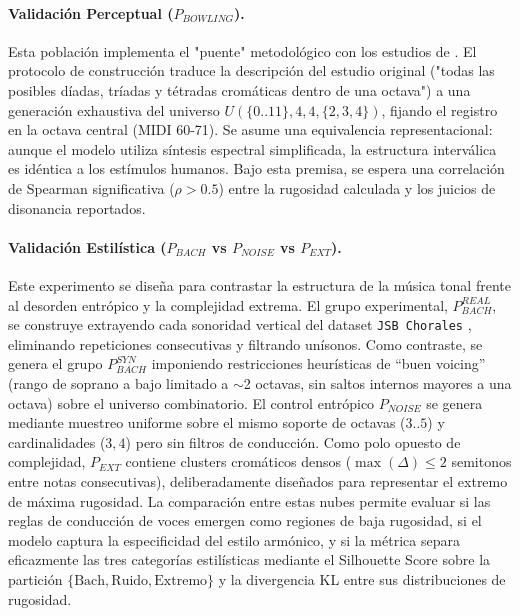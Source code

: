 \paragraph{Validación Perceptual ($P_{BOWLING}$).}
Esta población implementa el "puente" metodológico con los estudios de . El protocolo de construcción traduce la descripción del estudio original ("todas las posibles díadas, tríadas y tétradas cromáticas dentro de una octava") a una generación exhaustiva del universo $U(\{0..11\}, 4, 4, \{2, 3, 4\})$, fijando el registro en la octava central (MIDI 60-71). Se asume una equivalencia representacional: aunque el modelo utiliza síntesis espectral simplificada, la estructura interválica es idéntica a los estímulos humanos. Bajo esta premisa, se espera una correlación de Spearman significativa ($\rho > 0.5$) entre la rugosidad calculada y los juicios de disonancia reportados.

\paragraph{Validación Estilística ($P_{BACH}$ vs $P_{NOISE}$ vs $P_{EXT}$).}
Este experimento se diseña para contrastar la estructura de la música tonal frente al desorden entrópico y la complejidad extrema. El grupo experimental, $P_{BACH}^{REAL}$, se construye extrayendo cada sonoridad vertical del dataset \texttt{JSB Chorales} \cite{huang2016counterpoint}, eliminando repeticiones consecutivas y filtrando unísonos. Como contraste, se genera el grupo $P_{BACH}^{SYN}$ imponiendo restricciones heurísticas de ``buen voicing'' (rango de soprano a bajo limitado a $\sim$2 octavas, sin saltos internos mayores a una octava) sobre el universo combinatorio. El control entrópico $P_{NOISE}$ se genera mediante muestreo uniforme sobre el mismo soporte de octavas ($3..5$) y cardinalidades ($3,4$) pero sin filtros de conducción. Como polo opuesto de complejidad, $P_{EXT}$ contiene clusters cromáticos densos ($\max(\Delta) \le 2$ semitonos entre notas consecutivas), deliberadamente diseñados para representar el extremo de máxima rugosidad. La comparación entre estas nubes permite evaluar si las reglas de conducción de voces emergen como regiones de baja rugosidad, si el modelo captura la especificidad del estilo armónico, y si la métrica separa eficazmente las tres categorías estilísticas mediante el Silhouette Score sobre la partición $\{\text{Bach}, \text{Ruido}, \text{Extremo}\}$ y la divergencia KL entre sus distribuciones de rugosidad.


